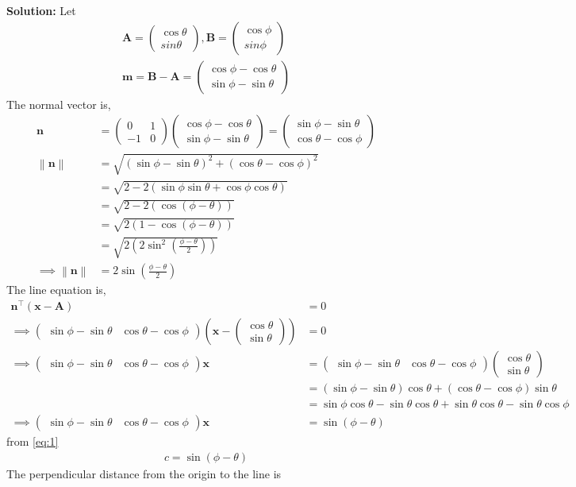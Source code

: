 \documentclass[10pt]{article}
\providecommand{\brak}[1]{\ensuremath{\left(#1\right)}}
\providecommand{\norm}[1]{\left\lVert#1\right\rVert}
\newcommand{\solution}{\noindent \textbf{Solution: }}
\newcommand{\myvec}[1]{\ensuremath{\begin{pmatrix}#1\end{pmatrix}}}
\let\vec\mathbf
\begin{document}
\begin{enumerate}
\solution
Let
\begin{align}
\vec{A}=\myvec{\cos\theta\\sin\theta},\vec{B}=\myvec{\cos\phi\\sin\phi}\\
\vec{m}=\vec{B}-\vec{A}=\myvec{\cos\phi-\cos\theta\\\sin\phi-\sin\theta}
\end{align}
The normal vector is,
\begin{align}
\vec{n}&=\myvec{0&1\\-1&0}\myvec{\cos\phi-\cos\theta\\\sin\phi-\sin\theta}=\myvec{\sin\phi-\sin\theta\\\cos\theta-\cos\phi}\\
\norm{\vec{n}}&=\sqrt{\brak{\sin\phi-\sin\theta}^2+\brak{\cos\theta-\cos\phi}^2}\\
&=\sqrt{2-2\brak{\sin\phi\sin\theta+\cos\phi\cos\theta}}\\
&=\sqrt{2-2\brak{\cos\brak{\phi-\theta}}}\\
&=\sqrt{2\brak{1-\cos\brak{\phi-\theta}}}\\
&=\sqrt{2\brak{2\sin^2\brak{\frac{\phi-\theta}{2}}}}\\
\implies\norm{\vec{n}}&=2\sin\brak{\frac{\phi-\theta}{2}}
\end{align}
The line equation is,
\begin{align}
\vec{n}^\top\brak{\vec{x}-\vec{A}}&=0\\
\implies\myvec{\sin\phi-\sin\theta&\cos\theta-\cos\phi}\brak{\vec{x}-\myvec{\cos\theta\\\sin\theta}}&=0\\
\implies\myvec{\sin\phi-\sin\theta&\cos\theta-\cos\phi}\vec{x}&=\myvec{\sin\phi-\sin\theta&\cos\theta-\cos\phi}\myvec{\cos\theta\\\sin\theta}\\
&=\brak{\sin\phi-\sin\theta}\cos\theta+\brak{\cos\theta-\cos\phi}\sin\theta\\
&=\sin\phi\cos\theta-\sin\theta\cos\theta+\sin\theta\cos\theta-\sin\theta\cos\phi\\
\implies\myvec{\sin\phi-\sin\theta&\cos\theta-\cos\phi}\vec{x}&=\sin\brak{\phi-\theta}
\label{eq:1}
\end{align}
from \eqref{eq:1}
\begin{align}
c=\sin\brak{\phi-\theta}
\end{align}
The perpendicular distance from the origin to the line is
\begin{align}

\end{align}
\end{enumerate}
\end{document}

